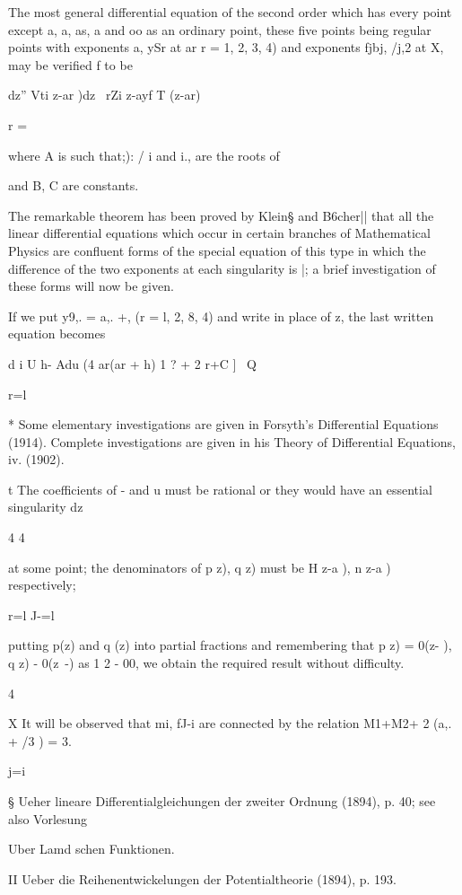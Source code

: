 The most general differential equation of the second order which has
every point except a, a, as, a and oo as an ordinary point, these
five points being regular points with exponents a, ySr at ar r = 1,
2, 3, 4) and exponents fjbj, /j,2 at X, may be verified f to be

dz'' Vti z-ar )dz \ rZi z-ayf T (z-ar)

r = \

where A is such that;): / i and i., are the roots of

and B, C are constants.

The remarkable theorem has been proved by Klein§ and B6cher|| that all
the linear differential equations which occur in certain branches of
Mathematical Physics are confluent forms of the special equation of
this type in which the difference of the two exponents at each
singularity is |; a brief investigation of these forms will now be
given.

If we put y9,. = a,. +, (r = l, 2, 8, 4) and write in place of z, the
last written equation becomes

d i U h- Adu (4 ar(ar + h) 1 ? + 2 r+C ] \ Q

r=l

* Some elementary investigations are given in Forsyth's Differential
Equations (1914). Complete investigations are given in his Theory of
Differential Equations, iv. (1902).

t The coefficients of - and u must be rational or they would have an
essential singularity dz

4 4

at some point; the denominators of p z), q z) must be H z-a ), n z-a )
respectively;

r=l J-=l

putting p(z) and q (z) into partial fractions and remembering that p
z) = 0(z- ), q z) - 0(z~-) as 1 2 - 00, we obtain the required result
without difficulty.

4

X It will be observed that mi, fJ-i are connected by the relation
M1+M2+ 2 (a,. + /3 ) = 3.

j=i

§ Ueher lineare Differentialgleichungen der zweiter Ordnung (1894), p.
40; see also Vorlesung

Uber Lamd schen Funktionen.

II Ueber die Reihenentwickelungen der Potentialtheorie (1894), p. 193.

%
%

